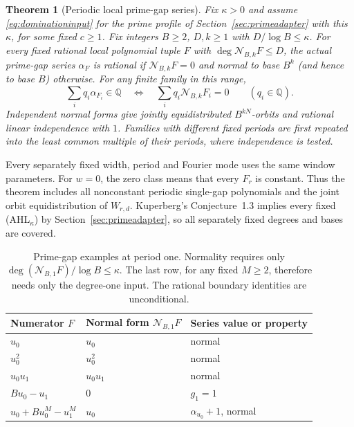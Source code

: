 \documentclass[11pt,a4paper]{article}
\newtheorem{theorem}{Theorem}[section]
\newcommand{\Q}{\mathbb Q}
\begin{document}
\begin{theorem}[Periodic local prime-gap series]\label{thm:prime}
Fix $\kappa>0$ and assume \eqref{eq:dominationinput} for the prime profile
of Section~\ref{sec:primeadapter} with this $\kappa$, for some fixed
$c\ge1$. Fix integers $B\ge2$, $D,k\ge1$ with $D/\log B\le\kappa$.
For every fixed rational local polynomial tuple $F$ with
$\deg\mathcal N_{B,k}F\le D$, the actual prime-gap series $\alpha_F$
is rational if $\mathcal N_{B,k}F=0$ and normal to base $B^k$
(and hence to base $B$) otherwise. For any finite family in this range,
\[
 \sum_iq_i\alpha_{F_i}\in\Q
 \quad\Longleftrightarrow\quad
 \sum_iq_i\mathcal N_{B,k}F_i=0\qquad(q_i\in\Q).
\]
Independent normal forms give jointly equidistributed $B^{kN}$-orbits
and rational linear independence with $1$. Families with different
fixed periods are first repeated into the least common multiple of
their periods, where independence is tested.
\end{theorem}

Every separately fixed width, period and Fourier mode uses the same
window parameters.
For $w=0$, the zero class means that every $F_r$ is constant.
Thus the theorem includes all nonconstant periodic single-gap
polynomials and the joint orbit equidistribution of $W_{r,d}$.
Kuperberg's Conjecture~1.3 implies every fixed
\textup{(AHL$_\kappa$)} by Section~\ref{sec:primeadapter}, so all
separately fixed degrees and bases are covered.

\begin{table}[t]
\centering
\begin{tabular}{@{}lll@{}}
\toprule
Numerator $F$ & Normal form $\mathcal N_{B,1}F$ & Series value or property\\
\midrule
$u_0$ & $u_0$ & normal\\
$u_0^2$ & $u_0^2$ & normal\\
$u_0u_1$ & $u_0u_1$ & normal\\
$Bu_0-u_1$ & $0$ & $g_1=1$\\
$u_0+Bu_0^M-u_1^M$ & $u_0$ & $\alpha_{u_0}+1$, normal\\
\bottomrule
\end{tabular}
\caption{Prime-gap examples at period one. Normality requires only
$\deg(\mathcal N_{B,1}F)/\log B\le\kappa$. The last row, for any fixed
$M\ge2$, therefore needs only the degree-one input. The rational
boundary identities are unconditional.}
\label{tab:examples}
\end{table}
\end{document}
